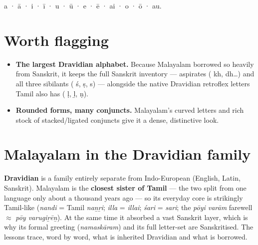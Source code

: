 \textbf{} a · \textbf{} ā · \textbf{} i · \textbf{} ī · \textbf{} u · \textbf{} ū · \textbf{} e · \textbf{} ē · \textbf{} ai · \textbf{} o · \textbf{} ō · \textbf{} au.

\section*{Worth flagging}

\begin{itemize}
\raggedright
\setlength{\itemsep}{0.35em}
  \item \textbf{The largest Dravidian alphabet.} Because Malayalam borrowed so heavily from Sanskrit, it keeps the full Sanskrit inventory — aspirates ( kh,  dh…) and all three sibilants ( ś,  ṣ,  s) — alongside the native Dravidian retroflex letters Tamil also has ( ḷ,  ḻ,  ṇ).
  \item \textbf{Rounded forms, many conjuncts.} Malayalam's curved letters and rich stock of stacked/ligated conjuncts give it a dense, distinctive look.
\end{itemize}

\section*{Malayalam in the Dravidian family}

\textbf{Dravidian} is a family entirely separate from Indo-European (English, Latin, Sanskrit). Malayalam is the \textbf{closest sister of Tamil} — the two split from one language only about a thousand years ago — so its everyday core is strikingly Tamil-like (\emph{nandi} = Tamil \emph{naṉṟi}; \emph{illa} = \emph{illai}; \emph{śari} = \emph{sari}; the \emph{pōyi varām} farewell $\approx$ \emph{pōy varugiṟēṉ}). At the same time it absorbed a vast Sanskrit layer, which is why its formal greeting (\emph{namaskāram}) and its full letter-set are Sanskritised. The lessons trace, word by word, what is inherited Dravidian and what is borrowed.
